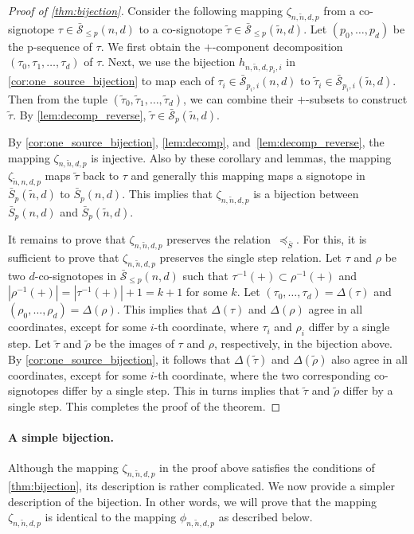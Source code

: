 \documentclass[a4paper,11pt]{amsart}
\newcommand{\calS}{\mathcal{S}}
\newcommand{\tn}{\tilde{n}}
\begin{document}
\begin{proof}[Proof of \cref{thm:bijection}]
    Consider the following mapping $\zeta_{n,\tn,d,p}$ from a co-signotope $\tau \in \bar{\calS}_{\leq p}(n,d)$ to a co-signotope $\tilde{\tau} \in \bar{\calS}_{\leq p}(\tn,d)$.
    Let $(p_0, \dots, p_d)$ be the p-sequence of $\tau$.
    We first obtain the $+$-component decomposition $(\tau_0,\tau_1,\dots,\tau_d)$ of $\tau$.
    Next, we use the bijection $h_{n,\tn,d,p_i,i}$ in \cref{cor:one_source_bijection} to map each of $\tau_i \in \bar{\calS}_{p_i,i}(n,d)$ to $\tilde{\tau}_i \in \bar{\calS}_{p_i,i}(\tn,d)$.
    Then from the tuple $(\tilde{\tau}_0,\tilde{\tau}_1,\dots,\tilde{\tau}_d)$, we can combine their $+$-subsets to construct $\tilde{\tau}$.
    By \cref{lem:decomp_reverse}, $\tilde{\tau} \in \bar{\calS}_{p}(\tn,d)$. 

    By \cref{cor:one_source_bijection}, \cref{lem:decomp}, and~\cref{lem:decomp_reverse}, the mapping $\zeta_{n,\tn,d,p}$ is injective.
    Also by these corollary and lemmas, the mapping $\zeta_{\tn,n,d,p}$ maps $\tilde{\tau}$ back to $\tau$ and generally this mapping maps a signotope in $\bar{S}_p(\tilde{n},d)$ to $\bar{S}_p(n,d)$.
    This implies that $\zeta_{n,\tn,d,p}$ is a bijection between $\bar{S}_p(n,d)$ and $\bar{S}_p(\tilde{n},d)$.

    It remains to prove that $\zeta_{n,\tn,d,p}$ preserves the relation~$\preceq_{\bar{S}}$.
    For this, it is sufficient to prove that $\zeta_{n,\tn,d,p}$ preserves the single step relation.
    Let $\tau$ and $\rho$ be two $d$-co-signotopes in $\bar{\calS}_{\leq p}(n,d)$ such that $\tau^{-1}(+) \subset \rho^{-1}(+)$ and $|\rho^{-1}(+)| = |\tau^{-1}(+)| + 1 = k+1$ for some $k$.
    Let $(\tau_0, \dots, \tau_d) = \Delta(\tau)$ and $(\rho_0, \dots, \rho_d) = \Delta(\rho)$.
    This implies that $\Delta(\tau)$ and $\Delta(\rho)$ agree in all coordinates, except for some $i$-th coordinate, where $\tau_i$ and $\rho_i$ differ by a single step.
    Let $\tilde{\tau}$ and $\tilde{\rho}$ be the images of $\tau$ and $\rho$, respectively, in the bijection above.
    By \cref{cor:one_source_bijection}, it follows that $\Delta(\tilde{\tau})$ and $\Delta(\tilde{\rho})$ also agree in all coordinates, except for some $i$-th coordinate, where the two corresponding co-signotopes differ by a single step.
    This in turns implies that $\tilde{\tau}$ and $\tilde{\rho}$ differ by a single step.
    This completes the proof of the theorem.
\end{proof}

\paragraph*{A simple bijection.}
Although the mapping $\zeta_{n,\tn,d,p}$ in the proof above satisfies the conditions of \cref{thm:bijection}, its description is rather complicated.
We now provide a simpler description of the bijection.
In other words, we will prove that the mapping $\zeta_{n,\tn,d,p}$ is identical to the mapping $\phi_{n,\tn,d,p}$ as described below.
\end{document}
